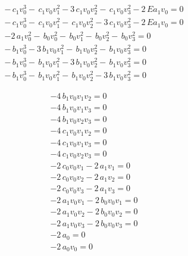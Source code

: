 \documentclass{beamer}
\begin{document}
\begin{frame}
\begin{minipage}{.7\linewidth}
\begin{equation*}
\begin{array}{r}
- \, c_{1} v_{0}^{3} -  \, c_{1} v_{0} v_{1}^{2} - 3 \, c_{1} v_{0} v_{2}^{2} -  \, c_{1} v_{0} v_{3}^{2} - 2 \, E a_{1} v_{0} =0\\
- \, c_{1} v_{0}^{3} -  \, c_{1} v_{0} v_{1}^{2} -  \, c_{1} v_{0} v_{2}^{2} - 3 \, c_{1} v_{0} v_{3}^{2} - 2 \, E a_{1} v_{0} =0\\
-2 \, a_{1} v_{0}^{2} -  \, b_{0} v_{0}^{2} -  \, b_{0} v_{1}^{2} -  \, b_{0} v_{2}^{2} -  \, b_{0} v_{3}^{2} =0\\
- \, b_{1} v_{0}^{3} - 3 \, b_{1} v_{0} v_{1}^{2} -  \, b_{1} v_{0} v_{2}^{2} -  \, b_{1} v_{0} v_{3}^{2} =0\\
- \, b_{1} v_{0}^{3} -  \, b_{1} v_{0} v_{1}^{2} - 3 \, b_{1} v_{0} v_{2}^{2} -  \, b_{1} v_{0} v_{3}^{2} =0\\
- \, b_{1} v_{0}^{3} -  \, b_{1} v_{0} v_{1}^{2} -  \, b_{1} v_{0} v_{2}^{2} - 3 \, b_{1} v_{0} v_{3}^{2} =0
\end{array}
\end{equation*}
\end{minipage}%
\begin{minipage}{.3\linewidth}
\begin{equation*}
\begin{array}{r}
-4 \, b_{1} v_{0} v_{1} v_{2} =0\\
-4 \, b_{1} v_{0} v_{1} v_{3} =0\\
-4 \, b_{1} v_{0} v_{2} v_{3} =0\\
-4 \, c_{1} v_{0} v_{1} v_{2} =0\\
-4 \, c_{1} v_{0} v_{1} v_{3} =0\\
-4 \, c_{1} v_{0} v_{2} v_{3} =0\\
-2 \, c_{0} v_{0} v_{1} - 2 \, a_{1} v_{1} =0\\
-2 \, c_{0} v_{0} v_{2} - 2 \, a_{1} v_{2} =0\\
-2 \, c_{0} v_{0} v_{3} - 2 \, a_{1} v_{3} =0\\
-2 \, a_{1} v_{0} v_{1} - 2 \, b_{0} v_{0} v_{1} =0\\
-2 \, a_{1} v_{0} v_{2} - 2 \, b_{0} v_{0} v_{2} =0\\
-2 \, a_{1} v_{0} v_{3} - 2 \, b_{0} v_{0} v_{3} =0\\
-2 \, a_{0} =0\\
-2 \, a_{0} v_{0} =0\\
\end{array}
\end{equation*}
\end{minipage}
\end{frame}
\end{document}
